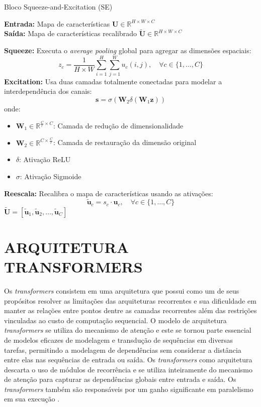 \begin{algorithm}
\caption{Bloco Squeeze-and-Excitation (SE)}
\label{alg:se_block}
\textbf{Entrada:} Mapa de características $\mathbf{U} \in \mathbb{R}^{H \times W \times C}$\\
\textbf{Saída:} Mapa de características recalibrado $\tilde{\mathbf{U}} \in \mathbb{R}^{H \times W \times C}$
\begin{algorithmic}[1]
\STATE \textbf{Squeeze:} Executa o \textit{average pooling} global para agregar as dimensões espaciais:
\[
z_c = \frac{1}{H \times W} \sum_{i=1}^H \sum_{j=1}^W u_c(i, j), \quad \forall c \in \{1, \dots, C\}
\]
\STATE \textbf{Excitation:} Usa duas camadas totalmente conectadas para modelar a interdependência dos canais:
\[
\mathbf{s} = \sigma(\mathbf{W}_2 \delta(\mathbf{W}_1 \mathbf{z}))
\]
onde:
\begin{itemize}
    \item $\mathbf{W}_1 \in \mathbb{R}^{\frac{C}{r} \times C}$: Camada de redução de dimensionalidade
    \item $\mathbf{W}_2 \in \mathbb{R}^{C \times \frac{C}{r}}$: Camada de restauração da dimensão original
    \item $\delta$: Ativação ReLU
    \item $\sigma$: Ativação Sigmoide
\end{itemize}
\STATE \textbf{Reescala:} Recalibra o mapa de características usando as ativações:
\[
\tilde{\mathbf{u}}_c = s_c \cdot \mathbf{u}_c, \quad \forall c \in \{1, \dots, C\}
\]
\RETURN $\tilde{\mathbf{U}} = [\tilde{\mathbf{u}}_1, \tilde{\mathbf{u}}_2, \dots, \tilde{\mathbf{u}}_C]$
\end{algorithmic}
\end{algorithm}


\section{ARQUITETURA TRANSFORMERS}
\label{sec:transformers}

Os \textit{transformers} consistem em uma arquitetura que possui como um de seus propósitos resolver as limitações das arquiteturas recorrentes e sua dificuldade em manter as relações entre pontos dentre as camadas recorrentes além das restrições vinculadas ao custo de computação sequencial. O modelo de arquitetura \textit{transformers} se utiliza do mecanismo de atenção e este se tornou parte essencial de modelos eficazes de modelagem e transdução de sequências em diversas tarefas, permitindo a modelagem de dependências sem considerar a distância entre elas nas sequências de entrada ou saída. Os \textit{transformers} como arquitetura descarta o uso de módulos de recorrência e se utiliza inteiramente do mecanismo de atenção para capturar as dependências globais entre entrada e saída. Os \textit{transformers} também são responsáveis por um ganho significante em paralelismo em sua execução \cite{vaswaniAttentionAllYou2023}.

